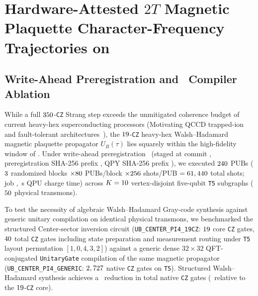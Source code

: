 \documentclass[aps,prx,twocolumn,superscriptaddress,nofootinbib]{revtex4-2}
\begin{document}


\section{Hardware-Attested $2T$ Magnetic Plaquette Character-Frequency Trajectories on \BTPlaqFezBackend}

\subsection{Write-Ahead Preregistration and \BTPlaqFezCzReductionRatio\ Compiler Ablation}

While a full $350$-\texttt{CZ} Strang step exceeds the unmitigated coherence budget of current heavy-hex superconducting processors (Motivating QCCD trapped-ion and fault-tolerant architectures~\cite{DavisBT2T002}), the $19$-\texttt{CZ} heavy-hex Walsh--Hadamard magnetic plaquette propagator $U_B(\tau)$ lies squarely within the high-fidelity window of \BTPlaqFezBackend. Under write-ahead preregistration \BTPlaqFezProtocolId\ (staged at commit \BTPlaqFezWriteAheadCommit, preregistration SHA-256 prefix \BTPlaqFezPreregShaPrefix, QPY SHA-256 prefix \BTPlaqFezQpyShaPrefix), we executed $240$ PUBs ($3$ randomized blocks $\times 80$ PUBs/block $\times 256$ shots/PUB $= 61,440$ total shots; job \BTPlaqFezJobId, \BTPlaqFezQpuSec\,s QPU charge time) across $K = 10$ vertex-disjoint five-qubit \texttt{T5} subgraphs ($50$ physical transmons).

To test the necessity of algebraic Walsh--Hadamard Gray-code synthesis against generic unitary compilation on identical physical transmons, we benchmarked the structured Center-sector inversion circuit (\texttt{UB\_CENTER\_PI4\_19CZ}: $19$ core \texttt{CZ} gates, $40$ total \texttt{CZ} gates including state preparation and measurement routing under \texttt{T5} layout permutation $[1, 0, 4, 3, 2]$) against a generic dense $32\times 32$ QFT-conjugated \texttt{UnitaryGate} compilation of the same magnetic propagator (\texttt{UB\_CENTER\_PI4\_GENERIC}: $2,727$ native \texttt{CZ} gates on \texttt{T5}). Structured Walsh--Hadamard synthesis achieves a \BTPlaqFezCzReductionRatio\ reduction in total native \texttt{CZ} gates (\BTPlaqFezCoreCzReductionRatio\ relative to the $19$-\texttt{CZ} core).
\end{document}
